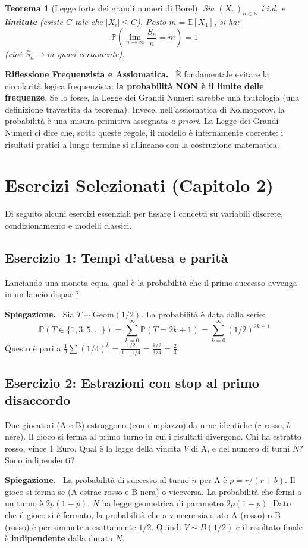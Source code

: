 \documentclass[11pt, a4paper]{report}
\theoremstyle{plain}
\newtheorem{theorem}{Teorema}[chapter]
\theoremstyle{definition}
\theoremstyle{remark}
\newenvironment{hint}[1][Hint]
{\begin{mdframed}[backgroundcolor=blue!5, linecolor=blue!50, linewidth=2pt, topline=false, rightline=false, bottomline=false]
\textbf{\textsf{#1.}}\ }
{\end{mdframed}}
\newenvironment{spiegazione}[1][Spiegazione]
{\begin{mdframed}[backgroundcolor=green!5, linecolor=green!50, linewidth=2pt, topline=false, rightline=false, bottomline=false]
\textbf{\textsf{#1.}}\ }
{\end{mdframed}}
\newcommand{\PP}{\mathbb{P}}
\newcommand{\E}{\mathbb{E}}
\newcommand{\N}{\mathbb{N}}
\newcommand{\1}{\mathbf{1}}
\begin{document}
\begin{theorem}[Legge forte dei grandi numeri di Borel]
Sia $(X_n)_{n \in \N}$ i.i.d. e \textbf{limitate} (esiste $C$ tale che $|X_i| \le C$). Posto $m = \E[X_1]$, si ha:
\[ \PP\left( \lim_{n\to\infty} \frac{S_n}{n} = m \right) = 1 \]
(cioè $\bar{S}_n \to m$ quasi certamente).
\end{theorem}

\begin{hint}[Riflessione Frequenzista e Assiomatica]
È fondamentale evitare la circolarità logica frequenzista: \textbf{la probabilità NON è il limite delle frequenze}. Se lo fosse, la Legge dei Grandi Numeri sarebbe una tautologia (una definizione travestita da teorema).
Invece, nell'assiomatica di Kolmogorov, la probabilità è una misura primitiva assegnata \emph{a priori}. La Legge dei Grandi Numeri ci dice che, sotto queste regole, il modello è internamente coerente: i risultati pratici a lungo termine si allineano con la costruzione matematica.
\end{hint}

\section{Esercizi Selezionati (Capitolo 2)}

Di seguito alcuni esercizi essenziali per fissare i concetti su variabili discrete, condizionamento e modelli classici.

\subsection*{Esercizio 1: Tempi d'attesa e parità}
Lanciando una moneta equa, qual è la probabilità che il primo successo avvenga in un lancio dispari?
\begin{spiegazione}
Sia $T \sim \text{Geom}(1/2)$. La probabilità è data dalla serie:
\[ \PP(T \in \{1,3,5,\dots\}) = \sum_{k=0}^\infty \PP(T = 2k+1) = \sum_{k=0}^\infty (1/2)^{2k+1} \]
Questo è pari a $\frac{1}{2} \sum (1/4)^k = \frac{1/2}{1 - 1/4} = \frac{1/2}{3/4} = \frac{2}{3}$.
\end{spiegazione}

\subsection*{Esercizio 2: Estrazioni con stop al primo disaccordo}
Due giocatori (A e B) estraggono (con rimpiazzo) da urne identiche ($r$ rosse, $b$ nere). Il gioco si ferma al primo turno in cui i risultati divergono. Chi ha estratto rosso, vince 1 Euro. Qual è la legge della vincita $V$ di A, e del numero di turni $N$? Sono indipendenti?
\begin{spiegazione}
La probabilità di successo al turno $n$ per A è $p = r/(r+b)$. Il gioco si ferma se (A estrae rosso e B nera) o viceversa. La probabilità che fermi a un turno è $2p(1-p)$.
$N$ ha legge geometrica di parametro $2p(1-p)$.
Dato che il gioco si è fermato, la probabilità che a vincere sia stato A (rosso) o B (rosso) è per simmetria esattamente $1/2$.
Quindi $V \sim B(1/2)$ e il risultato finale è \textbf{indipendente} dalla durata $N$.
\end{spiegazione}
\end{document}
